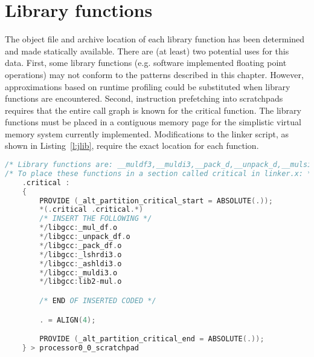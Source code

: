 \section{Library functions}

The object file and archive location of each library function has been determined and made statically available. There are (at least) two potential uses for this data. First, some library functions (e.g. software implemented floating point operations) may not conform to the patterns described in this chapter. However, approximations based on runtime profiling could be substituted when library functions are encountered. Second, instruction prefetching into scratchpads requires that the entire call graph is known for the critical function. The library functions must be placed in a contiguous memory page for the simplistic virtual memory system currently implemented. Modifications to the linker script, as shown in Listing~\ref{l:jlib}, require the exact location for each function.

% 
\begin{lstlisting}[caption={Placing library functions in \texttt{.critical} region},label=l:jlib,language=C]
/* Library functions are: __muldf3,__muldi3,__pack_d,__unpack_d,__mulsi3,__lshrdi3,__ashldi3 */
/* To place these functions in a section called critical in linker.x: */
    .critical :
    {
        PROVIDE (_alt_partition_critical_start = ABSOLUTE(.));
        *(.critical .critical.*)
        /* INSERT THE FOLLOWING */
        */libgcc:_mul_df.o
        */libgcc:_unpack_df.o
        */libgcc:_pack_df.o
        */libgcc:_lshrdi3.o
        */libgcc:_ashldi3.o
        */libgcc:_muldi3.o
        */libgcc:lib2-mul.o

        /* END OF INSERTED CODED */

        . = ALIGN(4);

        PROVIDE (_alt_partition_critical_end = ABSOLUTE(.));
    } > processor0_0_scratchpad


\end{lstlisting}


